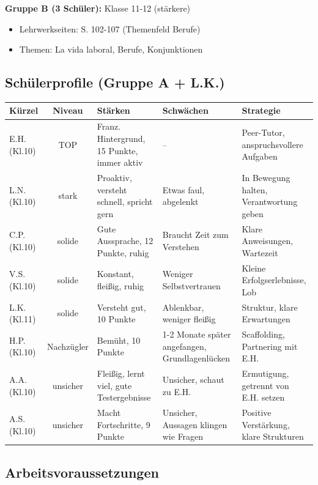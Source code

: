 \documentclass[11pt, a4paper]{article}
\begin{document}
\textbf{Gruppe B (3 Schüler):} Klasse 11-12 (stärkere)
\begin{itemize}[leftmargin=2em]
    \item Lehrwerkseiten: S. 102-107 (Themenfeld Berufe)
    \item Themen: La vida laboral, Berufe, Konjunktionen
\end{itemize}

\subsection{Schülerprofile (Gruppe A + L.K.)}

\begin{center}
\small
\begin{tabularx}{\textwidth}{|l|c|X|X|X|}
    \hline
    \textbf{Kürzel} & \textbf{Niveau} & \textbf{Stärken} & \textbf{Schwächen} & \textbf{Strategie} \\
    \hline
    E.H. (Kl.10) & TOP & Franz. Hintergrund, 15 Punkte, immer aktiv & -- & Peer-Tutor, anspruchsvollere Aufgaben \\
    \hline
    L.N. (Kl.10) & stark & Proaktiv, versteht schnell, spricht gern & Etwas faul, abgelenkt & In Bewegung halten, Verantwortung geben \\
    \hline
    C.P. (Kl.10) & solide & Gute Aussprache, 12 Punkte, ruhig & Braucht Zeit zum Verstehen & Klare Anweisungen, Wartezeit \\
    \hline
    V.S. (Kl.10) & solide & Konstant, fleißig, ruhig & Weniger Selbstvertrauen & Kleine Erfolgserlebnisse, Lob \\
    \hline
    L.K. (Kl.11) & solide & Versteht gut, 10 Punkte & Ablenkbar, weniger fleißig & Struktur, klare Erwartungen \\
    \hline
    H.P. (Kl.10) & Nachzügler & Bemüht, 10 Punkte & 1-2 Monate später angefangen, Grundlagenlücken & Scaffolding, Partnering mit E.H. \\
    \hline
    A.A. (Kl.10) & unsicher & Fleißig, lernt viel, gute Testergebnisse & Unsicher, schaut zu E.H. & Ermutigung, getrennt von E.H. setzen \\
    \hline
    A.S. (Kl.10) & unsicher & Macht Fortschritte, 9 Punkte & Unsicher, Aussagen klingen wie Fragen & Positive Verstärkung, klare Strukturen \\
    \hline
\end{tabularx}
\end{center}

\subsection{Arbeitsvoraussetzungen}
\end{document}
